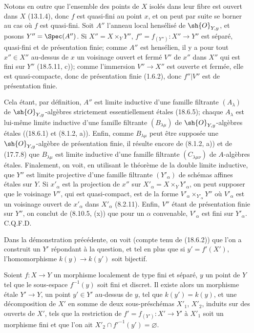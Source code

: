 Notons en outre que l'ensemble des points de $X$ isolés dans leur fibre est ouvert dans $X$ (13.1.4), donc $f$ est quasi-fini au point $x$, et on peut par suite se borner au cas où $f$ est quasi-fini. Soit $A''$ l'anneau local hensélisé de $\sh{O}_{Y,y}$, et posons $Y''=\Spec(A'')$. Si $X''=X\times_Y Y''$, $f''=f_{(Y'')}:X''\to Y''$ est séparé, quasi-fini et de présentation finie; comme $A''$ est hensélien, il y a pour tout $x''\in X''$ au-dessus de $x$ un voisinage ouvert et fermé $V''$ de $x''$ dans $X''$ qui est fini sur $Y''$ (18.5.11, c)); comme l'immersion $V''\to X''$ est ouverte et fermée, elle est quasi-compacte, donc de présentation finie (1.6.2), donc $f''|V''$ est de présentation finie.

Cela étant, par définition, $A''$ est limite inductive d'une famille filtrante $(A_\lambda)$ de $\sh{O}_{Y,y}$-algèbres strictement essentiellement étales (18.6.5); chaque $A_\lambda$ est lui-même limite inductive d'une famille filtrante $(B_{\lambda\mu})$ de $\sh{O}_{Y,y}$-algèbres étales ((18.6.1) et (8.1.2, a)). Enfin, comme $B_{\lambda\mu}$ peut être supposée une $\sh{O}_{Y,y}$-algèbre de présentation finie, il résulte encore de (8.1.2, a)) et de (17.7.8) que $B_{\lambda\mu}$ est limite inductive d'une famille filtrante $(C_{\lambda\mu\nu})$ de $A$-algèbres étales. Finalement, on voit, en utilisant le théorème de la double limite inductive, que $Y''$ est limite projective d'une famille filtrante $(Y'_\alpha)$ de schémas affines étales sur $Y$. Si $x'_\alpha$ est la projection de $x''$ sur $X'_\alpha=X\times_Y Y'_\alpha$, on peut supposer que le voisinage $V''$, qui est quasi-compact, est de la forme $V'_\alpha\times_{Y'_\alpha}Y''$ où $V'_\alpha$ est un voisinage ouvert de $x'_\alpha$ dans $X'_\alpha$ (8.2.11). Enfin, $V''$ étant de présentation finie sur $Y''$, on conclut de (8.10.5, (x)) que pour un $\alpha$ convenable, $V'_\alpha$ est fini sur $Y'_\alpha$. C.Q.F.D.

\begin{remark}[18.12.2]
\label{IV.18.12.2}
Dans la démonstration précédente, on voit (compte tenu de (18.6.2)) que l'on a construit un $Y'$ répondant à la question, et tel en plus que si $y'=f'(X')$, l'homomorphisme $k(y)\to k(y')$ soit bijectif.
\end{remark}

\begin{corollary}[18.12.3]
\label{IV.18.12.3}
Soient $f:X\to Y$ un morphisme localement de type fini et séparé, $y$ un point de $Y$ tel que le sous-espace $f^{-1}(y)$ soit fini et discret. Il existe alors un morphisme étale $Y'\to Y$, un point $y'\in Y'$ au-dessus de $y$, tel que $k(y')=k(y)$, et une décomposition de $X'$ en somme de deux sous-préschémas $X'_1$, $X'_2$, induits sur des ouverts de $X'$, tels que la restriction de $f'=f_{(Y')}:X'\to Y'$ à $X'_1$ soit un morphisme fini et que l'on ait $X'_2\cap f'^{-1}(y')=\varnothing$.
\end{corollary}

